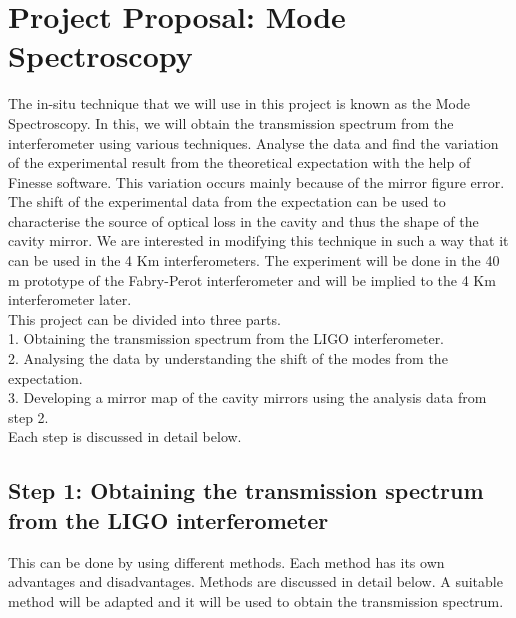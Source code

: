 \documentclass[colorlinks=true,pdfstartview=FitV,linkcolor=blue,
            citecolor=red,urlcolor=magenta]{ligodoc}
\begin{document}
\section{Project Proposal: Mode Spectroscopy}
The in-situ technique that we will use in this project is known as the Mode Spectroscopy. In this, we will obtain the transmission spectrum from the interferometer using various techniques. Analyse the data and find the variation of the experimental result from the theoretical expectation with the help of Finesse software. This variation occurs mainly because of the mirror figure error. The shift of the experimental data from the expectation can be used to characterise the source of optical loss in the cavity and thus the shape of the cavity mirror. We are interested in modifying this technique in such a way that it can be used in the 4 Km interferometers. The experiment will be done in the 40 m prototype of the Fabry-Perot interferometer and will be implied to the 4 Km interferometer later.
\vspace{5mm}
\\This project can be divided into three parts.
\\1.	Obtaining the transmission spectrum from the LIGO interferometer.
\\2.	Analysing the data by understanding the shift of the modes from the expectation.
\\3.	Developing a mirror map of the cavity mirrors using the analysis data from step 2.
\vspace{5mm}
\\Each step is discussed in detail below.

\subsection{Step 1: Obtaining the transmission spectrum from the LIGO interferometer }
This can be done by using different methods. Each method has its own advantages and disadvantages. Methods are discussed in detail below. A suitable method will be adapted and it will be used to obtain the transmission spectrum. 
\end{document}
